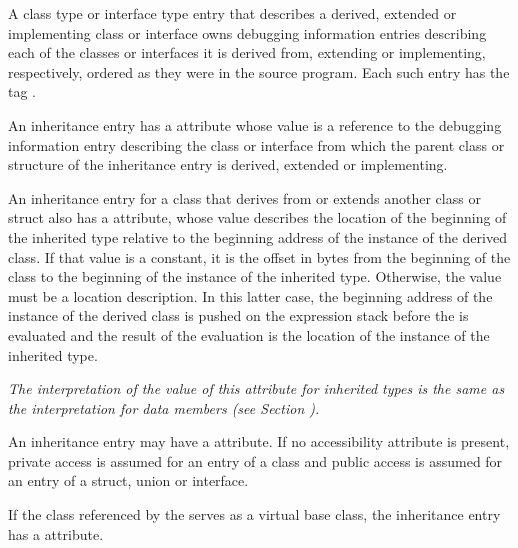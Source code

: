 {A class type or interface type entry that describes a
derived, extended or implementing class or interface owns
debugging information entries describing each of the classes
or interfaces it is derived from, extending or implementing,
respectively, ordered as they were in the source program. Each
such entry has 
the 
tag \DWTAGinheritanceTARG.

An inheritance entry 
has 
a 
\DWATtype{} attribute whose value is
a reference to the debugging information entry describing the
class or interface from which the parent class or structure
of the inheritance entry is derived, extended or implementing.

An\hypertarget{chap:DWATdatamemberlocationinheritedmemberlocation}{} 
inheritance entry
for a class that derives from or extends
another class or struct also has a 
\DWATdatamemberlocationDEFN{} attribute, 
whose value describes the location of the beginning
of the inherited type relative to the beginning address of the
instance of the derived class. If that value is a constant, it is the offset
in bytes from the beginning of the class to the beginning of
the instance of the inherited type. Otherwise, the value must be a location
description. In this latter case, the beginning address of
the instance of the derived class is pushed on the expression stack before
the 
is evaluated and the result of the
evaluation is the location of the instance of the inherited type.

\textit{The interpretation of the value of this attribute for
inherited types is the same as the interpretation for data
members 
(see Section ).  }

An\hypertarget{chap:DWATaccessibilitycppinheritedmembers}{} 
inheritance entry may have a
\hyperlink{chap:DWATaccessibilityattribute}{\DWATaccessibilityNAME}
attribute.
If no accessibility attribute is present, private access 
is assumed for an entry of a class and public access is 
assumed for an entry of a struct, union or interface.

If the class referenced by the 
serves as a  virtual base class, the 
inheritance entry has a 
\hyperlink{chap:DWATvirtualityvirtualityindication}{\DWATvirtualityNAME} 
attribute.

}

